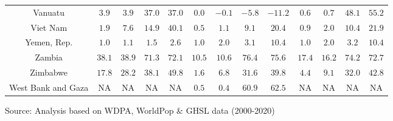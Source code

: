\begin{longtable}{ccccccccccccc}
Vanuatu & $3.9$ & $3.9$ & $37.0$ & $37.0$ & $0.0$ & $-0.1$ & $-5.8$ & $-11.2$ & $0.6$ & $0.7$ & $48.1$ & $55.2$ \\ 
Viet Nam & $1.9$ & $7.6$ & $14.9$ & $40.1$ & $0.5$ & $1.1$ & $9.1$ & $20.4$ & $0.9$ & $2.0$ & $10.4$ & $21.9$ \\ 
Yemen, Rep. & $1.0$ & $1.1$ & $1.5$ & $2.6$ & $1.0$ & $2.0$ & $3.1$ & $10.4$ & $1.0$ & $2.0$ & $3.2$ & $10.4$ \\ 
Zambia & $38.1$ & $38.9$ & $71.3$ & $72.1$ & $10.5$ & $10.6$ & $76.4$ & $75.6$ & $17.4$ & $16.2$ & $74.2$ & $72.7$ \\ 
Zimbabwe & $17.8$ & $28.2$ & $38.1$ & $49.8$ & $1.6$ & $6.8$ & $31.6$ & $39.8$ & $4.4$ & $9.1$ & $32.0$ & $42.8$ \\ 
West Bank and Gaza & NA & NA & NA & NA & $0.5$ & $0.4$ & $60.9$ & $62.5$ & NA & NA & NA & NA \\ 
\bottomrule
\end{longtable}
\begin{minipage}{\linewidth}
Source: Analysis based on WDPA, WorldPop \& GHSL data (2000-2020)\\
\end{minipage}

